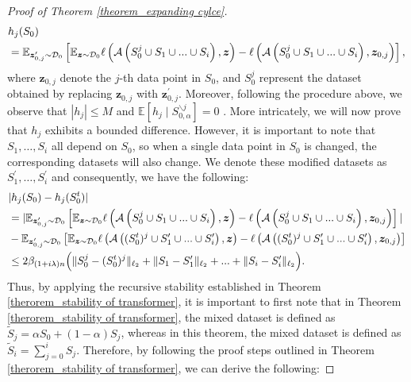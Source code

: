 \begin{proof}[Proof of Theorem \ref{theorem_expanding cylce}]
\begin{align}
&h_j(S_{0})\notag\\
&=\mathbb{E}_{\boldsymbol{z}_{0,j}^{\prime} \sim \mathcal{D}_0} \left[\mathbb{E}_{\boldsymbol{z} \sim \mathcal{D}_0} \ell\left(\mathcal{A}\left(S_{0}^j \cup  S_1\cup ...\cup S_{i}\right), \boldsymbol{z}\right)-\ell\left(\mathcal{A}\left(S_{0}^j \cup S_1\cup ...\cup S_{i}\right), \boldsymbol{z}_{0,j}\right)\right],
\end{align}
where $\boldsymbol{z}_{0, j}$ denote the $j$-th data point in $S_{0}$, and $S_{0}^j$ represent the dataset obtained by replacing $\boldsymbol{z}_{0, j}$ with $\boldsymbol{z}_{0, j}^{\prime}$. Moreover, following the procedure above, we observe that $\left|h_j\right| \leq M$ and $\mathbb{E}\left[h_j \mid S_{0, \alpha}^{\backslash j}\right]=0$
. More intricately, we will now prove that $h_j$ exhibits a bounded difference. However, it is important to note that $S_1, \ldots, S_i$ all depend on $S_0$, so when a single data point in $S_0$ is changed, the corresponding datasets will also change. We denote these modified datasets as $S_1^{\prime}, \ldots, S_i^{\prime}$ and consequently, we have the following:
\begin{align}
  & | h_j(S_0)-h_j(S_0^t)|\notag \\
 &= |\mathbb{E}_{\boldsymbol{z}_{0,j}^{\prime} \sim \mathcal{D}_0} \left[\mathbb{E}_{\boldsymbol{z} \sim \mathcal{D}_0} \ell\left(\mathcal{A}\left(S_{0}^j \cup  S_1\cup ...\cup S_{i}\right), \boldsymbol{z}\right)-\ell\left(\mathcal{A}\left(S_{0}^j \cup S_1\cup ...\cup S_{i}\right), \boldsymbol{z}_{0,j}\right)\right] |\notag\\
&-  \mathbb{E}_{\boldsymbol{z}_{0,j}^{\prime} \sim \mathcal{D}_0} \left[\mathbb{E}_{\boldsymbol{z} \sim \mathcal{D}_0} \ell\left(\mathcal{A}\left((S_{0}^t)^j \cup  S_1'\cup ...\cup S_{i}'\right), \boldsymbol{z}\right)-\ell\left(\mathcal{A}\left((S_{0}^t)^j \cup S_1'\cup ...\cup S_{i}'\right), \boldsymbol{z}_{0,j}\right)\right]\notag\\ 
&\leq 2\beta_{(1+i\lambda)n}\Big(\|S_{0}^j-(S_{0}^t)^j\|_{\ell_2} +\|S_1-S_1'\|_{\ell_2}+...+\|S_i-S_i'\|_{\ell_2}\Big).
\end{align}
Thus, by applying the recursive stability established in Theorem \ref{therorem_stability of transformer}, it is important to first note that in Theorem \ref{therorem_stability of transformer}, the mixed dataset is defined as $\widetilde{S}_j=\alpha S_0+(1-\alpha) S_j$, whereas in this theorem, the mixed dataset is defined as $\widetilde{S}_i=\sum_{j=0}^i S_j$. Therefore, by following the proof steps outlined in Theorem \ref{therorem_stability of transformer}, we can derive the following:

\end{proof}
